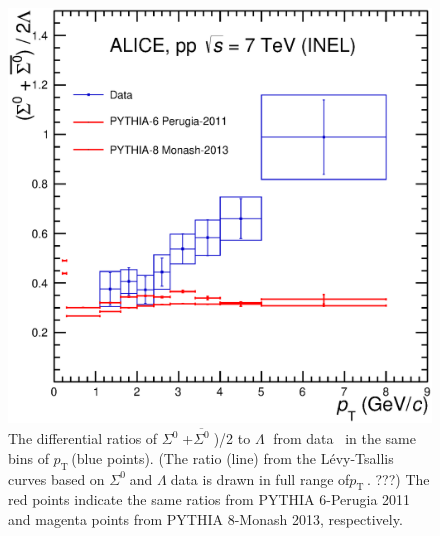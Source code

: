 \documentclass[ALICE,manyauthors]{cernphprep}
\newcommand{\sig}{\ensuremath{\Sigma^0  \; }}
\newcommand{\asig}{\ensuremath{\overline{\Sigma^0} \; }}
\newcommand{\lam}{\ensuremath{\Lambda \; }}
\newcommand{\pt}{\ensuremath{p_{\mathrm{T}\; }}}
\begin{document}
\begin{figure}[h!]
  \centering

   \includegraphics[width=10.cm]{Figure/ratio-Sigma0Lambda-7mar18.eps}

    \caption{ The differential ratios of \sig+\asig)/2 to \lam 
    from data~\cite{cite:ALICE-LF}  in the same bins of \pt (blue points). (The ratio (line) from the L\'{e}vy-Tsallis 
     curves based on \sig and \lam data is drawn     in full range of\pt. ???)
 The red points indicate the same ratios from PYTHIA 6-Perugia 2011 and magenta points from PYTHIA 8-Monash 2013, 
    respectively.
}
    \label{fig:siglam-ptdepratio}
\end{figure}
\end{document}
